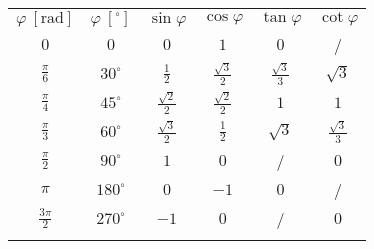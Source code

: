                 \begin{table}
                    \centering
                    \large
                    \addtolength{\tabcolsep}{6pt}
                    \renewcommand{\arraystretch}{1.5}                
                    \begin{tabular}{||c|c||c|c|c|c||} 
                        \hhline{|t:==:t:====:t|}
                        \rowcolor[rgb]{0.863,0.745,0.745}  
                                $\varphi~\left[\textrm{rad}\right] $ & $\varphi~\left[^\circ\right] $ & $\sin\varphi$ & $\cos\varphi$ & $\tan\varphi$ & $\cot\varphi$  \\ 
                        \hhline{|:==::====:|}
                                $0$ & $0$  & $0$ & $1$ & $0$ & /  \\ 
                        \hline
                                $\frac{\pi}{6}$ & $30^\circ$ & $\frac{1}{2}$ & $\frac{\sqrt{3}}{2}$ & $\frac{\sqrt{3}}{3}$ & $\sqrt{3}$  \\ 
                        \hline
                                $\frac{\pi}{4}$ & $45^\circ$ & $\frac{\sqrt{2}}{2}$ & $\frac{\sqrt{2}}{2}$ & $1$ & $1$  \\ 
                        \hline
                                $\frac{\pi}{3}$ & $60^\circ$ & $\frac{\sqrt{3}}{2}$ & $\frac{1}{2}$ & $\sqrt{3}$ & $\frac{\sqrt{3}}{3}$  \\ 
                        \hline
                                $\frac{\pi}{2}$ & $90^\circ$ & $1$ & $0$ & / & $0$  \\  
                        \hline
                                $\pi$ & $180^\circ$ & $0$ & $-1$ & $0$ & /  \\ 
                        \hline
                                $\frac{3\pi}{2}$ & $270^\circ$ & $-1$ & $0$ & / & $0$  \\ 
                        \hhline{|b:==:b:====:b|}
                    \end{tabular}
                \end{table}
            

        




